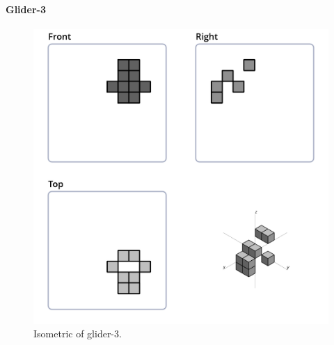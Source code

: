 \paragraph{Glider-3}
\begin{figure}
  \centering
  \includegraphics[scale=0.3]{iso_settings/glider_3.png}
  \caption{Isometric of glider-3.}
  \label{fig:iso-glider-3}
\end{figure}

